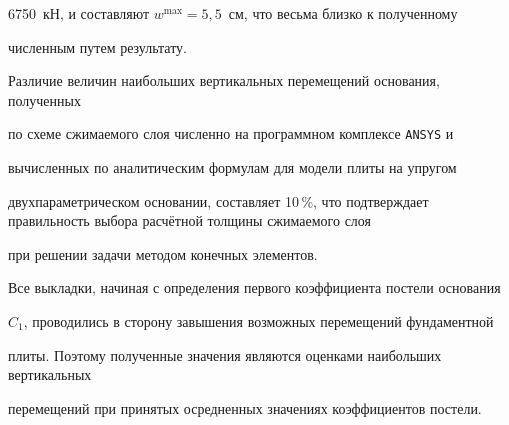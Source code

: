 6750~кН, и составляют $w^{\max}=5,5$~см, что весьма близко к полученному

численным путем результату.



Различие величин наибольших вертикальных перемещений основания, полученных

по схеме сжимаемого слоя численно на программном комплексе {\tt ANSYS} и

вычисленных по аналитическим формулам для модели плиты на упругом

двухпараметрическом основании, составляет 10\,{\%}, что подтверждает правильность выбора расчётной толщины сжимаемого слоя

при решении задачи методом конечных элементов.



Все выкладки, начиная с определения первого коэффициента постели основания

$C_1$, проводились в сторону завышения возможных перемещений фундаментной

плиты. Поэтому полученные значения являются оценками наибольших вертикальных

перемещений при принятых осредненных значениях коэффициентов постели.




